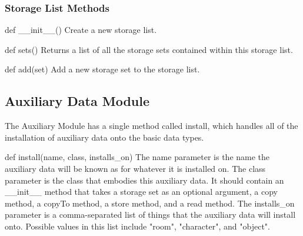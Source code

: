 \documentclass[12pt]{article}
\begin{document}
\subsubsection{Storage List Methods}
def \_\_init\_\_() \newline
Create a new storage list.

def sets() \newline
Returns a list of all the storage sets contained within this storage list.

def add(set) \newline
Add a new storage set to the storage list.



\subsection{Auxiliary Data Module}
The Auxiliary Module has a single method called install, which handles all of the installation of auxiliary data onto the basic data types.

def install(name, class, installs\_on) \newline
The name parameter is the name the auxiliary data will be known as for whatever it is installed on. The class parameter is the class that embodies this auxiliary data. It should contain an \_\_init\_\_ method that takes a storage set as an optional argument, a copy method, a copyTo method, a store method, and a read method. The installs\_on parameter is a comma-separated list of things that the auxiliary data will install onto. Possible values in this list include "room", "character", and "object".
\end{document}
